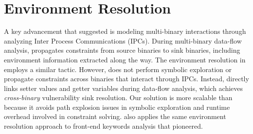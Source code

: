 \section{Environment Resolution}
\label{sec:environment}

A key advancement that \karonte suggested is modeling multi-binary interactions through analyzing Inter Process Communications (IPCs).
During multi-binary data-flow analysis, \karonte propagates constraints from source binaries to sink binaries, including environment information extracted along the way.
The environment resolution in \mango employs a similar tactic.
However, \mango does not perform symbolic exploration or propagate constraints across binaries that interact through IPCs.
Instead, \mango directly links setter values and getter variables during data-flow analysis, which achieves \emph{cross-binary} vulnerability sink resolution.
Our solution is more scalable than \karonte because it avoids path explosion issues in symbolic exploration and runtime overhead involved in constraint solving.
\mango also applies the same environment resolution approach to front-end keywords analysis that \satc pioneered.

